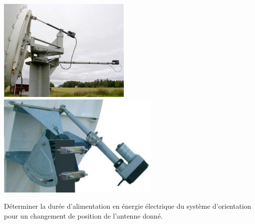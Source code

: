 \documentclass[11pt,oneside]{article}
\begin{document}
\begin{center}
\includegraphics[height=5cm]{png/fig4} 
\includegraphics[height=5cm]{png/fig5} 
\end{center}

\begin{obj}
Déterminer la durée d’alimentation en énergie électrique du système d’orientation pour un 
changement de position de l’antenne donné. 

\end{obj}
\end{document}
